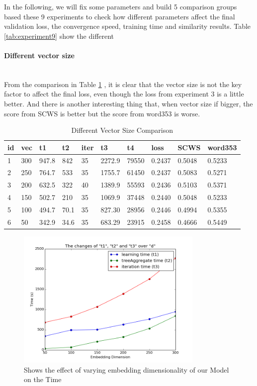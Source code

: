 In the following, we will fix some parameters and build 5 comparison groups based these 9 experiments to check how different parameters affect the final validation loss, the convergence speed, training time and similarity results. Table \ref{tab:experiment9} show the different 

\paragraph{Different vector size} \ \\
From the comparison in Table \ref{tab:group1} , it is clear that the vector size is not the key factor to affect the final loss, even though the loss from experiment 3 is a little better. And there is another interesting thing that, when vector size if bigger, the score from SCWS is better but the score from word353 is worse. 
\begin{table}[H]

\begin{center}
\begin{tabular}{|l|l|l|l|l|l|l|l|l|l|}
\hline
id& vec  & t1 & t2 & iter & t3 & t4 &   loss  & 	SCWS & 	word353	   \\ 
\hline
1 	& 300 	& 947.8	& 842	& 35	& 2272.9 &	79550  & 0.2437 &0.5048 & 0.5233  \\ 
\hline
2 	& 250 	& 764.7& 533	& 35	& 1755.7 &	61450  & 0.2437 &0.5083 & 0.5271 \\ 
\hline
3 	& 200 	& 632.5& 322	& 40	& 1389.9 &  55593  & 0.2436 &0.5103 & 0.5371 \\ 
\hline
4 	& 150 	& 502.7& 210	& 35	& 1069.9 &	37448  & 0.2440 &0.5048 & 0.5233 \\ 
\hline
5 	& 100 	& 494.7	& 70.1	& 35	& 827.30 &	28956  & 0.2446 &0.4994 & 0.5355  \\ 
\hline
6 	& 50 	& 342.9& 34.6	& 35	& 683.29 &	23915  & 0.2458 &0.4666 & 0.5449  \\ 
\hline
\end{tabular}
\caption{Different Vector Size Comparison} \label{tab:group1} 
\end{center}
\end{table}


\begin{figure}[!ht]
  \centering
	\includegraphics[width=0.8\textwidth]{vectime} 
	\caption{Shows the effect of varying embedding dimensionality of our Model on the Time}
	\label{fig:vec_time}
\end{figure}

